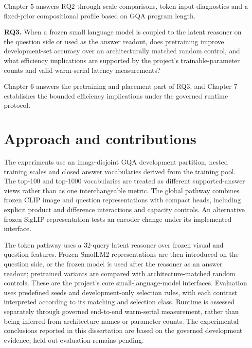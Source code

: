 Chapter 5 answers RQ2 through scale comparisons, token-input diagnostics and
a fixed-prior compositional profile based on GQA program length.

\label{rq:rq3}
\noindent\textbf{RQ3.} When a frozen small language model is coupled to the latent reasoner on the question side or used as the answer readout, does pretraining improve development-set accuracy over an architecturally matched random control, and what efficiency implications are supported by the project's trainable-parameter counts and valid warm-serial latency measurements?

Chapter 6 answers the pretraining and placement part of RQ3, and Chapter 7
establishes the bounded efficiency implications under the governed runtime
protocol.

\section{Approach and contributions}
\label{sec:ch1-approach}

The experiments use an image-disjoint GQA development partition, nested
training scales and closed answer vocabularies derived from the training pool.
The top-100 and top-1000 vocabularies are treated as different supported-answer
views rather than as one interchangeable metric. The global pathway combines
frozen CLIP image and question representations \citep{radford2021clip} with compact heads, including
explicit product and difference interactions and capacity controls.
An alternative frozen SigLIP representation \citep{zhai2023siglip} tests an encoder change under its
implemented interface.

The token pathway uses a 32-query latent reasoner over frozen visual and
question features. Frozen SmolLM2 representations \citep{benallal2025smollm2} are then introduced on the
question side, or the frozen model is used after the reasoner as an answer
readout; pretrained variants are compared with architecture-matched random
controls.
These are the project's core small-language-model interfaces. Evaluation uses
predefined seeds and development-only selection rules, with each contrast
interpreted according to its matching and selection class. Runtime is assessed
separately through governed end-to-end warm-serial measurement, rather than
being inferred from architecture names or parameter counts. The experimental
conclusions reported in this dissertation are based on the governed
development evidence; held-out evaluation remains pending.


